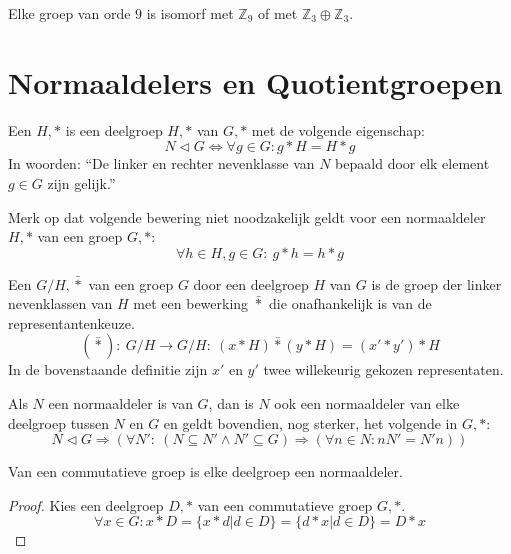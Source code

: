 \documentclass[main.tex]{subfiles}
\begin{document}
\begin{st}
  Elke groep van orde $9$ is isomorf met $\mathbb{Z}_{9}$ of met $\mathbb{Z}_{3} \oplus \mathbb{Z}_{3}$.
  
\end{st}

\section{Normaaldelers en Quotientgroepen}
\label{sec:normaaldelers-en-quotientgroepen}

\begin{de}
  Een  $H,*$ is een deelgroep $H,*$ van $G,*$ met de volgende eigenschap:
  \[ N \triangleleft G \Leftrightarrow \forall g \in G: g*H = H*g \]
  In woorden: ``De linker en rechter nevenklasse van $N$ bepaald door elk element $g\in G$ zijn gelijk.''
\end{de}

\begin{opm}
  Merk op dat volgende bewering niet noodzakelijk geldt voor een normaaldeler $H,*$ van een groep $G,*$:
  \[ \forall h \in H, g \in G:\ g*h = h*g \]
\end{opm}

\begin{de}
  Een  $G/H,\bar{*}$ van een groep $G$ door een deelgroep $H$ van $G$ is de groep der linker nevenklassen van $H$ met een bewerking $\bar{*}$ die onafhankelijk is van de representantenkeuze.
  \[ (\bar{*}):\ G/H \rightarrow G/H:\ (x*H)\bar{*}(y*H) = (x' * y') * H \]
  In de bovenstaande definitie zijn $x'$ en $y'$ twee willekeurig gekozen representaten.
\end{de}

\begin{ei}
  \label{ei:normaaldelers-tussen-groep-en-deler}
  Als $N$ een normaaldeler is van $G$, dan is $N$ ook een normaaldeler van elke deelgroep tussen $N$ en $G$ en geldt bovendien, nog sterker, het volgende in $G,*$:
  \[ N \triangleleft G \Rightarrow (\forall N':\ (N \subseteq N' \wedge N' \subseteq G) \Rightarrow (\forall n\in N: nN' = N'n)) \]
\end{ei}

\begin{st}
  Van een commutatieve groep is elke deelgroep een normaaldeler.

  \begin{proof}
    Kies een deelgroep $D,*$ van een commutatieve groep $G,*$.
    \[ \forall x\in G: x*D = \{ x*d | d \in D \} = \{ d*x | d \in D \} = D*x \]
  \end{proof}
\end{st}
\end{document}
